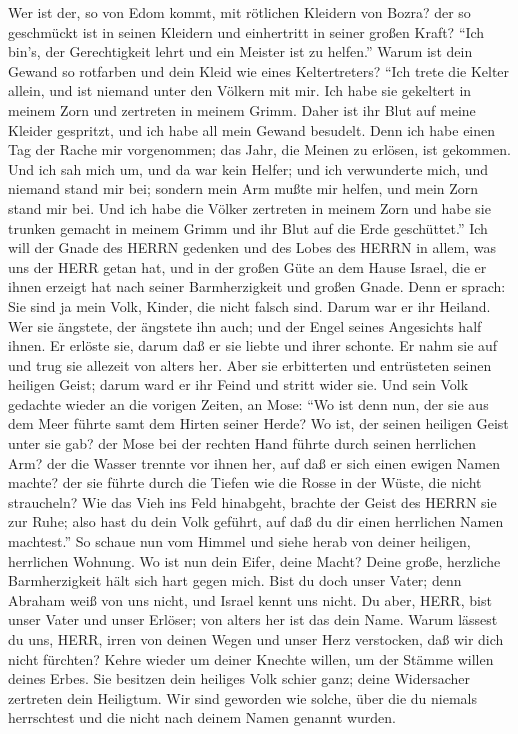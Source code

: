  Wer ist der, so von Edom kommt, mit rötlichen Kleidern von
Bozra? der so geschmückt ist in seinen Kleidern und einhertritt in
seiner großen Kraft? ``Ich bin's, der Gerechtigkeit lehrt und ein
Meister ist zu helfen.''  Warum ist dein Gewand so rotfarben
und dein Kleid wie eines Keltertreters?  ``Ich trete die
Kelter allein, und ist niemand unter den Völkern mit mir. Ich habe sie
gekeltert in meinem Zorn und zertreten in meinem Grimm. Daher ist ihr
Blut auf meine Kleider gespritzt, und ich habe all mein Gewand besudelt.
 Denn ich habe einen Tag der Rache mir vorgenommen; das
Jahr, die Meinen zu erlösen, ist gekommen.  Und ich sah mich
um, und da war kein Helfer; und ich verwunderte mich, und niemand stand
mir bei; sondern mein Arm mußte mir helfen, und mein Zorn stand mir bei.
 Und ich habe die Völker zertreten in meinem Zorn und habe
sie trunken gemacht in meinem Grimm und ihr Blut auf die Erde
geschüttet.''  Ich will der Gnade des HERRN gedenken und des
Lobes des HERRN in allem, was uns der HERR getan hat, und in der großen
Güte an dem Hause Israel, die er ihnen erzeigt hat nach seiner
Barmherzigkeit und großen Gnade.  Denn er sprach: Sie sind
ja mein Volk, Kinder, die nicht falsch sind. Darum war er ihr Heiland.
 Wer sie ängstete, der ängstete ihn auch; und der Engel
seines Angesichts half ihnen. Er erlöste sie, darum daß er sie liebte
und ihrer schonte. Er nahm sie auf und trug sie allezeit von alters her.
 Aber sie erbitterten und entrüsteten seinen heiligen
Geist; darum ward er ihr Feind und stritt wider sie.  Und
sein Volk gedachte wieder an die vorigen Zeiten, an Mose: ``Wo ist denn
nun, der sie aus dem Meer führte samt dem Hirten seiner Herde? Wo ist,
der seinen heiligen Geist unter sie gab?  der Mose bei der
rechten Hand führte durch seinen herrlichen Arm? der die Wasser trennte
vor ihnen her, auf daß er sich einen ewigen Namen machte? 
der sie führte durch die Tiefen wie die Rosse in der Wüste, die nicht
straucheln?  Wie das Vieh ins Feld hinabgeht, brachte der
Geist des HERRN sie zur Ruhe; also hast du dein Volk geführt, auf daß du
dir einen herrlichen Namen machtest.''  So schaue nun vom
Himmel und siehe herab von deiner heiligen, herrlichen Wohnung. Wo ist
nun dein Eifer, deine Macht? Deine große, herzliche Barmherzigkeit hält
sich hart gegen mich.  Bist du doch unser Vater; denn
Abraham weiß von uns nicht, und Israel kennt uns nicht. Du aber, HERR,
bist unser Vater und unser Erlöser; von alters her ist das dein Name.
 Warum lässest du uns, HERR, irren von deinen Wegen und
unser Herz verstocken, daß wir dich nicht fürchten? Kehre wieder um
deiner Knechte willen, um der Stämme willen deines Erbes. 
Sie besitzen dein heiliges Volk schier ganz; deine Widersacher zertreten
dein Heiligtum.  Wir sind geworden wie solche, über die du
niemals herrschtest und die nicht nach deinem Namen genannt wurden.

